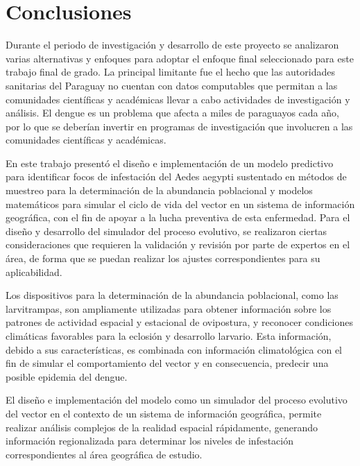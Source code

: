 \chapter{Conclusiones}
Durante el periodo de investigación y desarrollo de este proyecto se analizaron varias
alternativas y enfoques para adoptar el enfoque final seleccionado para este trabajo final de grado. La principal limitante fue el hecho que las autoridades sanitarias del Paraguay no cuentan con
datos computables que permitan a las comunidades científicas y académicas llevar a cabo actividades de investigación y análisis. El dengue es un problema que afecta a miles de paraguayos cada año, por lo que se deberían invertir en programas de investigación que involucren a las comunidades científicas y académicas.

En este trabajo presentó el diseño e implementación de un modelo predictivo para identificar focos
de infestación del Aedes aegypti sustentado en métodos de muestreo para la determinación de la abundancia poblacional y modelos matemáticos para simular el ciclo de vida del vector en un sistema de información geográfica, con el fin de apoyar a la lucha preventiva de esta enfermedad. Para el diseño y desarrollo del simulador del proceso evolutivo, se realizaron ciertas consideraciones que requieren la validación y revisión por parte de expertos en el área, de forma que se puedan realizar los ajustes correspondientes para su aplicabilidad.

Los dispositivos para la determinación de la abundancia poblacional, como las larvitrampas, son
ampliamente utilizadas para obtener información sobre los patrones de actividad espacial y
estacional de ovipostura, y reconocer condiciones climáticas favorables para la eclosión y
desarrollo larvario. Esta información, debido a sus características, es combinada con información
climatológica con el fin de simular el comportamiento del vector y en consecuencia, predecir una
posible epidemia del dengue.

El diseño e implementación del modelo como un simulador del proceso evolutivo del vector en el
contexto de un sistema de información geográfica, permite realizar análisis complejos de la
realidad espacial rápidamente, generando información regionalizada para determinar los niveles de
infestación correspondientes al área geográfica de estudio.

